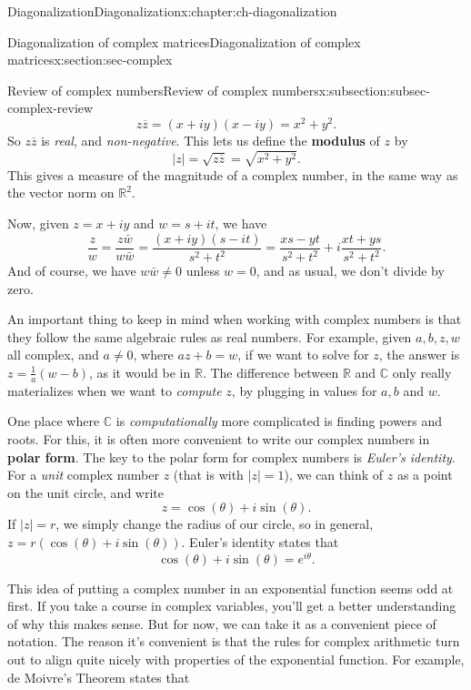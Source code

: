 \documentclass[oneside,10pt,]{book}
\newcommand{\terminology}[1]{\textbf{#1}}
\numberwithin{equation}{section}
\newcommand{\R}{\mathbb{R}}
\newcommand{\C}{\mathbb{C}}
\newcommand{\abs}[1]{\lvert #1\rvert}
\newcommand{\bz}{\overline{z}}
\begin{document}
\begin{chapterptx}{Diagonalization}{}{Diagonalization}{}{}{x:chapter:ch-diagonalization}
\begin{sectionptx}{Diagonalization of complex matrices}{}{Diagonalization of complex matrices}{}{}{x:section:sec-complex}
\begin{subsectionptx}{Review of complex numbers}{}{Review of complex numbers}{}{}{x:subsection:subsec-complex-review}
\begin{equation*}
z\bz = (x+iy)(x-iy)=x^2+y^2\text{.}
\end{equation*}
So \(z\bz\) is \emph{real}, and \emph{non-negative}. This lets us define the \terminology{modulus} of \(z\) by%
\begin{equation*}
\abs{z} = \sqrt{z\bz} = \sqrt{x^2+y^2}\text{.}
\end{equation*}
This gives a measure of the magnitude of a complex number, in the same way as the vector norm on \(\R^2\).%
\par
Now, given \(z=x+iy\) and \(w=s+it\), we have%
\begin{equation*}
\frac{z}{w}=\frac{z\bar{w}}{w\bar{w}} = \frac{(x+iy)(s-it)}{s^2+t^2} = \frac{xs-yt}{s^2+t^2}+i\frac{xt+ys}{s^2+t^2}\text{.}
\end{equation*}
And of course, we have \(w\bar{w}\neq 0\) unless \(w=0\), and as usual, we don't divide by zero.%
\par
An important thing to keep in mind when working with complex numbers is that they follow the same algebraic rules as real numbers. For example, given \(a,b,z,w\) all complex, and \(a\neq 0\), where \(az+b=w\), if we want to solve for \(z\), the answer is \(z=\frac1a(w-b)\), as it would be in \(\R\). The difference between \(\R\) and \(\C\) only really materializes when we want to \emph{compute} \(z\), by plugging in values for \(a,b\) and \(w\).%
\par
One place where \(\C\) is \emph{computationally} more complicated is finding powers and roots. For this, it is often more convenient to write our complex numbers in \terminology{polar form}. The key to the polar form for complex numbers is \emph{Euler's identity}. For a \emph{unit} complex number \(z\) (that is with \(\abs{z}=1\)), we can think of \(z\) as a point on the unit circle, and write%
\begin{equation*}
z = \cos(\theta)+i\sin(\theta)\text{.}
\end{equation*}
If \(\abs{z}=r\), we simply change the radius of our circle, so in general, \(z = r(\cos(\theta)+i\sin(\theta))\). Euler's identity states that%
\begin{equation}
\cos(\theta)+i\sin(\theta)=e^{i\theta}\text{.}\label{x:men:eq-euler}
\end{equation}
%
\par
This idea of putting a complex number in an exponential function seems odd at first. If you take a course in complex variables, you'll get a better understanding of why this makes sense. But for now, we can take it as a convenient piece of notation. The reason it's convenient is that the rules for complex arithmetic turn out to align quite nicely with properties of the exponential function. For example, de Moivre's Theorem states that%

\end{subsectionptx}
\end{sectionptx}
\end{chapterptx}
\end{document}
